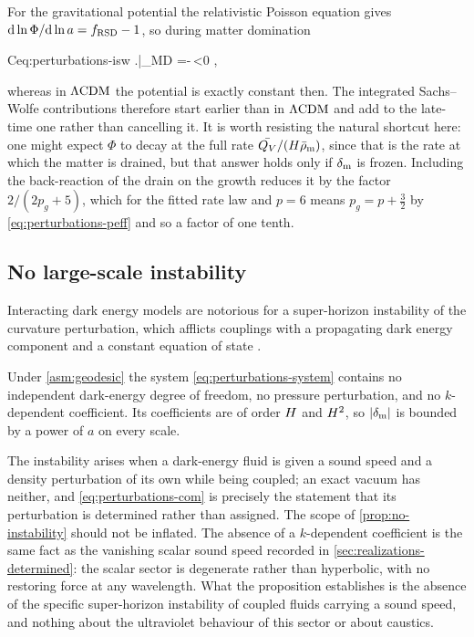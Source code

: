 For the gravitational potential the relativistic Poisson equation gives
$\mathrm{d}\ln\Phi/\mathrm{d}\ln a=f_{\rm RSD}-1$, so during matter domination
%
\begin{keyresult}{C}{eq:perturbations-isw}
  \left.\right|_{\rm MD}
  =-\,<0 ,
\end{keyresult}
%
whereas in $\Lambda\mathrm{CDM}$ the potential is exactly constant then. The integrated
Sachs--Wolfe contributions therefore start earlier than in $\Lambda\mathrm{CDM}$ and add to
the late-time one rather than cancelling it. It is worth resisting the natural
shortcut here: one might expect $\Phi$ to decay at the full rate
$\bar {Q_{V}}/(H\bar\rho_{\rm m})$, since that is the rate at which the matter
is drained, but that answer holds only if $\delta_{\rm m}$ is frozen. Including
the back-reaction of the drain on the growth reduces it by the factor
$2/(2p_g+5)$, which for the fitted rate law and $p=6$ means
$p_g=p+\tfrac32$ by \cref{eq:perturbations-peff} and so a factor of one
tenth.

\subsection{No large-scale instability}\label{sec:perturbations-stability}

Interacting dark energy models are notorious for a super-horizon instability of
the curvature perturbation, which afflicts couplings with a propagating dark
energy component and a constant equation of state
\parencite{valiviita2008_08040232}.

\begin{proposition}\label{prop:no-instability}
  Under \cref{asm:geodesic} the system \cref{eq:perturbations-system} contains
  no independent dark-energy degree of freedom, no pressure perturbation, and
  no $k$-dependent coefficient. Its coefficients are of order $H$ and
  $H^2$, so $|\delta_{\rm m}|$ is bounded by a power of $a$ on every scale.
\end{proposition}

The instability arises when a dark-energy fluid is given a sound speed and a
density perturbation of its own while being coupled; an exact vacuum has
neither, and \cref{eq:perturbations-com} is precisely the statement that its
perturbation is determined rather than assigned. 
The scope of \cref{prop:no-instability} should not be inflated. The absence of a
$k$-dependent coefficient is the same fact as the vanishing scalar sound speed
recorded in \cref{sec:realizations-determined}: the scalar sector is degenerate
rather than hyperbolic, with no restoring force at any wavelength. What the
proposition establishes is the absence of the specific super-horizon instability
of coupled fluids carrying a sound speed, and nothing about the ultraviolet
behaviour of this sector or about caustics.

